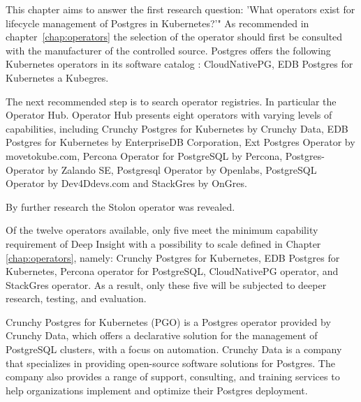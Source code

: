 \label{chap:searchForoperators}
This chapter aims to answer the first research question: 'What operators exist for lifecycle management of Postgres in Kubernetes?'"
As recommended in chapter~\ref{chap:operators} the selection of the operator should first be consulted with the manufacturer of the controlled source. Postgres offers the following Kubernetes operators in its software catalog \cite{docuPgSwCatalogue}: CloudNativePG, EDB Postgres for Kubernetes a Kubegres.

The next recommended step is to search operator registries. In particular the Operator Hub. \cite{operatorHubPGSearch} Operator Hub presents eight operators with varying levels of capabilities, including Crunchy Postgres for Kubernetes by Crunchy Data, EDB Postgres for Kubernetes by EnterpriseDB Corporation, Ext Postgres Operator by movetokube.com, Percona Operator for PostgreSQL by Percona, Postgres-Operator by Zalando SE, Postgresql Operator by Openlabs, PostgreSQL Operator by Dev4Ddevs.com and StackGres by OnGres.

By further research the Stolon operator was revealed. \cite{PalarkComparingKubernetes}

Of the twelve operators available, only five meet the minimum capability requirement of Deep Insight with a possibility to scale defined in Chapter \ref{chap:operators}, namely: Crunchy Postgres for Kubernetes, EDB Postgres for Kubernetes, Percona operator for PostgreSQL, CloudNativePG operator, and StackGres operator. As a result, only these five will be subjected to deeper research, testing, and evaluation.

\pagebreak
{}
Crunchy Postgres for Kubernetes (PGO) is a Postgres operator provided by Crunchy Data, which offers a declarative solution for the management of PostgreSQL clusters, with a focus on automation.
Crunchy Data is a company that specializes in providing open-source software solutions for Postgres. The company also provides a range of support, consulting, and training services to help organizations implement and optimize their Postgres deployment. \cite{Crunchy}

